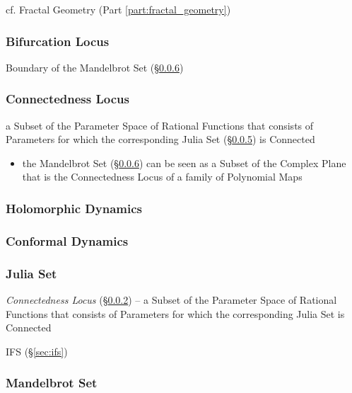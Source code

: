 cf. Fractal Geometry (Part \ref{part:fractal_geometry})



\subsubsection{Bifurcation Locus}\label{sec:bifurcation_locus}

Boundary of the Mandelbrot Set (\S\ref{sec:mandelbrot_set})



\subsubsection{Connectedness Locus}\label{sec:connectedness_locus}

a Subset of the Parameter Space of Rational Functions that consists of
Parameters for which the corresponding Julia Set (\S\ref{sec:julia_set}) is
Connected

\begin{itemize}
  \item the Mandelbrot Set (\S\ref{sec:mandelbrot_set}) can be seen as a Subset
    of the Complex Plane that is the Connectedness Locus of a family of
    Polynomial Maps
\end{itemize}



\subsubsection{Holomorphic Dynamics}\label{sec:holomorphic_dynamics}

\subsubsection{Conformal Dynamics}\label{sec:conformal_dynamics}

\subsubsection{Julia Set}\label{sec:julia_set}

\emph{Connectedness Locus} (\S\ref{sec:connectedness_locus}) -- a Subset of the
Parameter Space of Rational Functions that consists of Parameters for which the
corresponding Julia Set is Connected

IFS (\S\ref{sec:ifs})



\subsubsection{Mandelbrot Set}\label{sec:mandelbrot_set}

